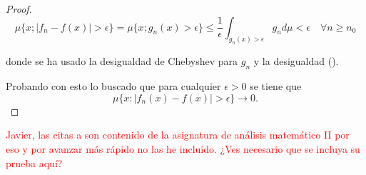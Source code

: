 \begin{proof}
    \begin{equation}
        \mu\{ x; |f_n - f(x)| > \epsilon \}
        = 
        \mu\{ x; g_n(x) > \epsilon \}
        \leq
        \frac{1}{\epsilon} 
        \int_{g_n(x) > \epsilon} g_n d\mu 
        < \epsilon 
        \quad
        \forall n \geq n_0
    \end{equation}

    donde se ha usado la desigualdad de Chebyshev para $g_n$ y la desigualdad 
    (). 

Probando con esto lo buscado que  para cualquier  $\epsilon > 0$ se tiene que 
$$\mu \{  x : |f_n(x) - f(x)| > \epsilon \} \longrightarrow 0.$$
\end{proof}


\textcolor{red}{Javier, las citas a \cite{nla.cat-vn1819421} son contenido de la 
asignatura de análisis matemático II por eso y por avanzar más rápido no las he incluido.
¿Ves necesario que se incluya su prueba aquí?}

